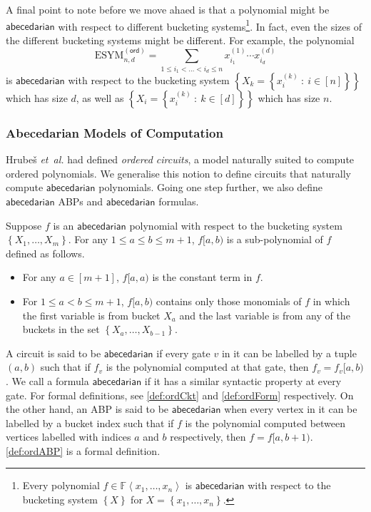 \documentclass[10pt,a4paper]{article}
\def\etal{\emph{et~al.}}
\def\Hrubes{Hrube{\v{s}}}
\def\Field{\mathbb{F}}
\let\F\Field
\def\set#1{\left\{ #1 \right\}}
\def\inbrace#1{\left\{ #1 \right\}}
\def\inangle#1{\left\langle #1 \right\rangle}
\def\setdef#1#2{\inbrace{ #1 \ : \ #2}}
\newcommand{\abcd}{\mathsf{abecedarian}}
\newcommand{\oesym}[2]{\mathrm{ESYM}_{#1,#2}^{\mathsf{(ord)}}}
\begin{document}
A final point to note before we move ahaed is that a polynomial might be $\abcd$ with respect to different bucketing systems\footnote{Every polynomial $f \in \F\inangle{x_1, \ldots, x_n}$ is $\abcd$ with respect to the bucketing system $\set{X}$ for $X = \set{x_1, \ldots, x_n}$.}. 
In fact, even the sizes of the different bucketing systems might be different. 
For example, the polynomial
\[
	\oesym{n}{d} = \sum_{1 \leq i_1 < \ldots < i_d \leq n} x^{(1)}_{i_1} \cdots x^{(d)}_{i_d}
\]
is $\abcd$ with respect to the bucketing system $\set{X_k = \setdef{x^{(k)}_i}{i \in [n]}}$ which has size $d$, as well as $\set{X_i = \setdef{x^{(k)}_i}{k \in [d]}}$ which has size $n$.

\subsubsection*{Abecedarian Models of Computation}

{\Hrubes} {\etal} \cite{HWY11} had defined \emph{ordered circuits}, a model naturally suited to compute ordered polynomials.
We generalise this notion to define circuits that naturally compute $\abcd$ polynomials.
Going one step further, we also define $\abcd$ ABPs and $\abcd$ formulas.

Suppose $f$ is an $\abcd$ polynomial with respect to the bucketing system $\set{X_1, \ldots, X_m}$. 
For any $1 \leq a \leq b \leq m+1$, $f[a,b)$ is a sub-polynomial of $f$ defined as follows.
\begin{itemize}
	\item For any $a \in [m+1]$, $f[a, a)$ is the constant term in $f$.
	\item For $1 \leq a < b \leq m+1$, $f[a,b)$ contains only those monomials of $f$ in which the first variable is from bucket $X_a$ and the last variable is from any of the buckets in the set $\set{X_a, \ldots, X_{b-1}}$. \qedhere
\end{itemize}

A circuit is said to be $\abcd$ if every gate $v$ in it can be labelled by a tuple $(a,b)$ such that if $f_v$ is the polynomial computed at that gate, then $f_v = f_v[a,b)$.
We call a formula $\abcd$ if it has a similar syntactic property at every gate. 
For formal definitions, see \autoref{def:ordCkt} and \autoref{def:ordForm} respectively.
On the other hand, an ABP is said to be $\abcd$ when every vertex in it can be labelled by a bucket index such that if $f$ is the polynomial computed between vertices labelled with indices $a$ and $b$ respectively, then $f = f[a,b+1)$. 
\autoref{def:ordABP} is a formal definition.
\end{document}
